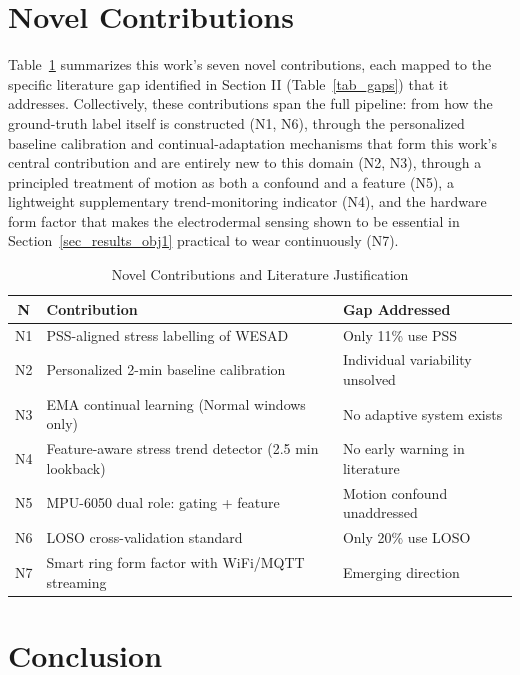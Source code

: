 \documentclass[conference]{IEEEtran}
\begin{document}
\section{Novel Contributions}
Table~\ref{tab_contributions} summarizes this work's seven
novel contributions, each mapped to the specific literature gap
identified in Section II (Table~\ref{tab_gaps}) that it
addresses. Collectively, these contributions span the full
pipeline: from how the ground-truth label itself is
constructed (N1, N6), through the personalized baseline
calibration and continual-adaptation mechanisms that form this
work's central contribution and are entirely new to this
domain (N2, N3), through a principled treatment of motion as
both a confound and a feature (N5), a lightweight supplementary
trend-monitoring indicator (N4), and the hardware form factor
that makes the electrodermal sensing shown to be essential in
Section~\ref{sec_results_obj1} practical to wear continuously
(N7).

\begin{table}[htbp]
\caption{Novel Contributions and
Literature Justification}
\begin{center}
\begin{tabular}{|c|p{3cm}|p{3cm}|}
\hline
\textbf{N} &
\textbf{Contribution} &
\textbf{Gap Addressed} \\
\hline
N1 & PSS-aligned stress labelling
of WESAD &
Only 11\% use PSS \cite{b15} \\
N2 & Personalized 2-min baseline
calibration &
Individual variability
unsolved \\
N3 & EMA continual learning
(Normal windows only) &
No adaptive system
exists \\
N4 & Feature-aware stress trend
detector (2.5 min lookback) &
No early warning
in literature \\
N5 & MPU-6050 dual role:
gating + feature &
Motion confound
unaddressed \\
N6 & LOSO cross-validation
standard &
Only 20\% use LOSO
\cite{b15} \\
N7 & Smart ring form factor
with WiFi/MQTT streaming &
Emerging direction
\cite{b6} \\
\hline
\end{tabular}
\label{tab_contributions}
\end{center}
\end{table}

\section{Conclusion}
\end{document}
